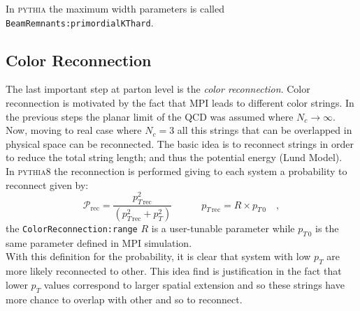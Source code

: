 In \textsc{pythia} the maximum width parameters is called \texttt{Beam}\-\texttt{Remnants:}\-\texttt{primordialKT}\-\texttt{hard}.

\subsection{Color Reconnection}

The last important step at parton level is the \textit{color reconnection}. Color reconnection is motivated by the fact that MPI leads to different color strings. In the previous steps the planar limit of the QCD was assumed where $N_c\rightarrow\infty$. Now, moving to real case where $N_c=3$ all this strings that can be overlapped in physical space can be reconnected. The basic idea is to reconnect strings in order to reduce the total string length; and thus the potential energy (Lund Model).
\\
In \textsc{pythia8} the reconnection is performed giving to each system a probability to reconnect given by:
\begin{equation}
	\mathcal{P}_{\text{rec}}=\frac{p_{T\,\text{rec}}^2}{\left(p_{T\,\text{rec}}^2 + p_T^2\right)} \qquad\quad p_{T\,\text{rec}}=R\times p_{T\,0}\quad,
\end{equation} 
the \texttt{ColorReconnection:range} $R$ is a user-tunable parameter while $p_{T\,0}$ is the same parameter defined in MPI simulation.
\\
With this definition for the probability, it is clear that system with low $p_T$ are more likely reconnected to other. This idea find is justification in the fact that lower $p_T$ values correspond to larger spatial extension and so these strings have more chance to overlap with other and so to reconnect.

